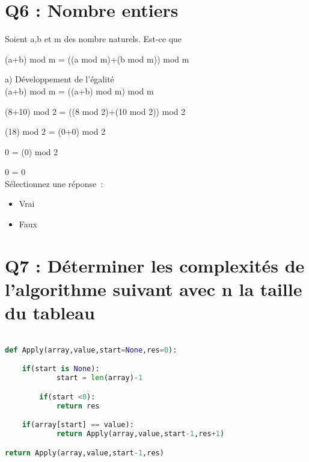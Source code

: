 \vspace{5mm} %

\section{Q6 : Nombre entiers}

\vspace{5mm} %


Soient a,b et m des nombre naturels. Est-ce que

\vspace{2mm} %

(a+b) mod m = ((a mod m)+(b mod m)) mod m \\

\vspace{4mm} %

a) Développement de l'égalité \\

(a+b) mod m = ((a+b) mod m) mod m

(8+10) mod 2 = ((8 mod 2)+(10 mod 2)) mod 2

(18) mod 2 = (0+0) mod 2

0 = (0) mod 2

0 = 0 \\

Sélectionnez une réponse :
\begin{itemize}[label=$\square$]
\item Vrai
\item Faux
\end{itemize}


\newpage
\section{Q7 : Déterminer les complexités de l’algorithme suivant avec n la taille du tableau}

\vspace{5mm} %

\begin{lstlisting}[language=Python, caption=Python algorithme]

def Apply(array,value,start=None,res=0):

	if(start is None):
            start = len(array)-1

        if(start <0):
            return res

	if(array[start] == value):
            return Apply(array,value,start-1,res+1)

return Apply(array,value,start-1,res)
\end{lstlisting}

